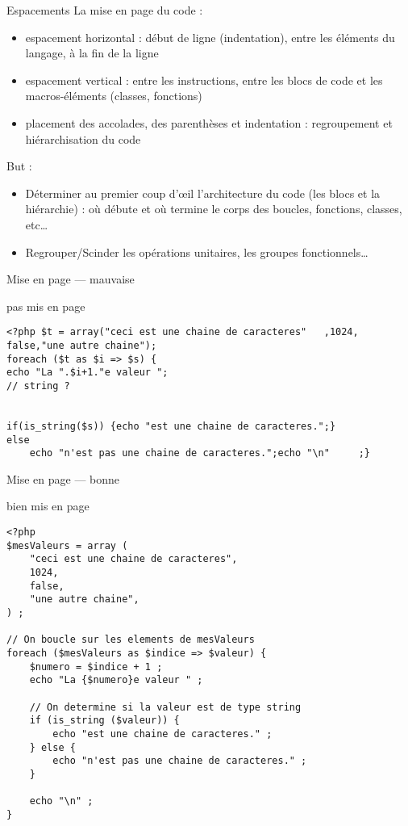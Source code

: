 \begin{frame}[containsverbatim]{Espacements}
	La mise en page du code : 
	\begin{itemize}
		\item espacement horizontal : début de ligne (indentation), entre les éléments du langage, à la fin de la ligne
		\item espacement vertical : entre les instructions, entre les blocs de code et les macros-éléments (classes, fonctions)
		\item placement des accolades, des parenthèses et indentation : regroupement et hiérarchisation du code
	\end{itemize}
	But : 
	\begin{itemize}
		\item Déterminer au premier coup d’œil l’architecture du code (les blocs et la hiérarchie) : où débute et où termine le corps des boucles, fonctions, classes, etc…
		\item Regrouper/Scinder les opérations unitaires, les groupes fonctionnels…
	\end{itemize}
\end{frame}

\begin{frame}[containsverbatim]{Mise en page — mauvaise}
	\begin{block}{pas mis en page}
		\begin{lstlisting}
<?php $t = array("ceci est une chaine de caracteres"   ,1024,
false,"une autre chaine");
foreach ($t as $i => $s) {
echo "La ".$i+1."e valeur ";
// string ?


if(is_string($s)) {echo "est une chaine de caracteres.";} 
else
	echo "n'est pas une chaine de caracteres.";echo "\n"     ;}
		\end{lstlisting}
	\end{block}
\end{frame}

\begin{frame}[containsverbatim]{Mise en page — bonne}
	\begin{block}{bien mis en page}
		\begin{lstlisting}
<?php
$mesValeurs = array (
	"ceci est une chaine de caracteres", 
	1024,
	false,
	"une autre chaine",
) ;

// On boucle sur les elements de mesValeurs
foreach ($mesValeurs as $indice => $valeur) {
	$numero = $indice + 1 ;
	echo "La {$numero}e valeur " ;

	// On determine si la valeur est de type string
	if (is_string ($valeur)) {
		echo "est une chaine de caracteres." ;
	} else {
		echo "n'est pas une chaine de caracteres." ;
	}
	
	echo "\n" ;
}
		\end{lstlisting}
	\end{block}
\end{frame}


